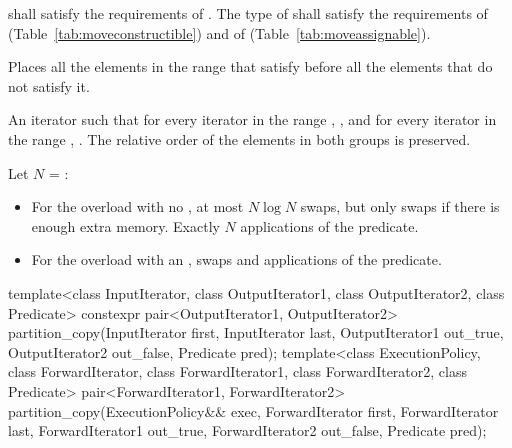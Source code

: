 \begin{itemdescr}
\pnum
\requires
{} shall satisfy the requirements of
. The type
of  shall satisfy the requirements of
 (Table~\ref{tab:moveconstructible}) and of
 (Table~\ref{tab:moveassignable}).

\pnum
\effects
Places all the elements in the range
that satisfy  before all the
elements that do not satisfy it.

\pnum
\returns
An iterator
such that for every iterator
in the range
,
,
and for every iterator
in the range
,
.
The relative order of the elements in both groups is preserved.

\pnum
\complexity
Let $N$ = :
\begin{itemize}
\item For the overload with no , at most $N \log N$ swaps,
but only  swaps if there is enough extra memory.  Exactly $N$
applications of the predicate.
\item For the overload with an ,
 swaps and  applications of the predicate.
\end{itemize}

\end{itemdescr}

%
\begin{itemdecl}
template<class InputIterator, class OutputIterator1,
         class OutputIterator2, class Predicate>
  constexpr pair<OutputIterator1, OutputIterator2>
    partition_copy(InputIterator first, InputIterator last,
                   OutputIterator1 out_true, OutputIterator2 out_false,
                   Predicate pred);
template<class ExecutionPolicy, class ForwardIterator, class ForwardIterator1,
         class ForwardIterator2, class Predicate>
  pair<ForwardIterator1, ForwardIterator2>
    partition_copy(ExecutionPolicy&& exec,
                   ForwardIterator first, ForwardIterator last,
                   ForwardIterator1 out_true, ForwardIterator2 out_false,
                   Predicate pred);
\end{itemdecl}


